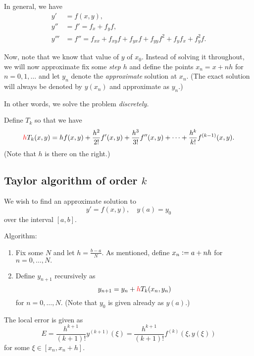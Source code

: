 \documentclass[12pt]{article}
\theoremstyle{definition}
\begin{document}
In general, we have
\begin{align*} 
	y' &= f(x, y),\\
	y'' &= f' = f_x + f_yf,\\
	y''' &= f'' = f_{xx} + f_{xy}f + f_{yx}f + f_{yy}f^2 + f_yf_x + f_y^2f.
\end{align*}

Now, note that we know that value of $y$ of $x_0.$ Instead of solving it throughout, we will now approximate fix some \emph{step} $h$ and define the points $x_n = x + nh$ for $n = 0, 1, \ldots$ and let $y_n$ denote the \emph{approximate} solution at $x_n.$ (The exact solution will always be denoted by $y(x_n)$ and approximate as $y_n.$)

In other words, we solve the problem \emph{discretely.}

Define $T_k$ so that we have
\begin{equation*} 
	{\color{red}h}T_k(x, y) = hf(x, y) + \frac{h^2}{2!}f'(x, y) + \frac{h^3}{3!}f''(x, y) + \cdots + \frac{h^k}{k!}f^{(k - 1)}(x, y).
\end{equation*}
(Note that $h$ is there on the right.)

\subsection{Taylor algorithm of order \texorpdfstring{$k$}{k}}

We wish to find an approximate solution to
\begin{equation*} 
	y' = f(x, y), \quad y(a) = y_0
\end{equation*}
over the interval $[a, b].$

Algorithm:
\begin{enumerate}
	\item Fix some $N$ and let $h = \frac{b - a}{N}.$ As mentioned, define $x_n \vcentcolon= a + nh$ for $n = 0, \ldots, N.$
	\item Define $y_{n + 1}$ recursively as
	\begin{equation*} 
		y_{n + 1} = y_n + {\color{red}h}T_k(x_n, y_n)
	\end{equation*}
	for $n = 0, \ldots, N.$ (Note that $y_0$ is given already as $y(a).$)
\end{enumerate}
The local error is given as
\begin{equation*} 
	E = \frac{h^{k + 1}}{(k + 1)!}y^{(k + 1)}(\xi) = \frac{h^{k + 1}}{(k + 1)!}f^{(k)}(\xi, y(\xi))
\end{equation*}	
for some $\xi \in [x_n, x_n + h].$
\end{document}
